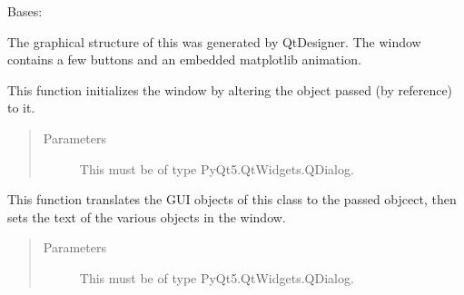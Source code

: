 \documentclass[letterpaper,10pt,english]{sphinxmanual}
\begin{document}

\begin{fulllineitems}
\label{\detokenize{plotGUI:plotGUI.Ui_Dialog}}
Bases: 

The graphical structure of this  was generated by QtDesigner.
The window contains a few buttons and an embedded matplotlib animation.

\begin{fulllineitems}
\label{\detokenize{plotGUI:plotGUI.Ui_Dialog.setupUi}}
This function initializes the window by altering the  object passed (by reference) to it.
\begin{quote}\begin{description}
\item[{Parameters}] \leavevmode
{} \textendash{} This must be of type PyQt5.QtWidgets.QDialog.

\end{description}\end{quote}

\end{fulllineitems}


\begin{fulllineitems}
\label{\detokenize{plotGUI:plotGUI.Ui_Dialog.retranslateUi}}
This function translates the GUI objects of this class to the passed  objcect,
then sets the text of the various objects in the window.
\begin{quote}\begin{description}
\item[{Parameters}] \leavevmode
{} \textendash{} This must be of type PyQt5.QtWidgets.QDialog.

\end{description}\end{quote}


\end{fulllineitems}
\end{fulllineitems}
\end{document}
